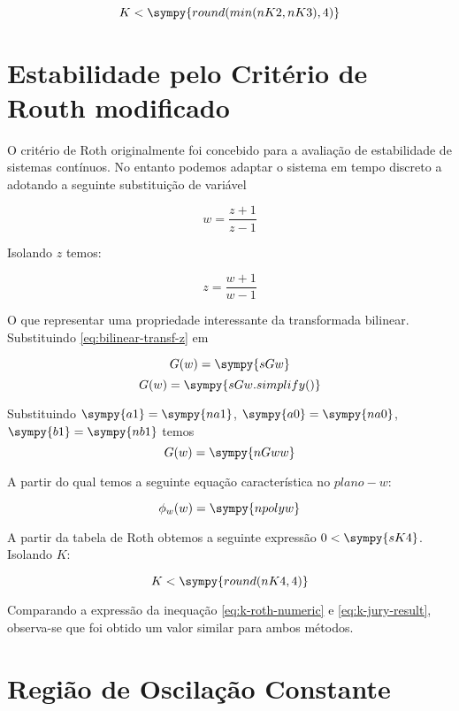 \documentclass[a4paper,11pt]{article}
\newcommand{\npy}[1]{\sympy{round(#1,4)}}
\begin{document}
\begin{equation}\label{eq:k-jury-result}
    K < \sympy{round(min(nK2,nK3),4)}
\end{equation}

\section{Estabilidade pelo Critério de Routh modificado}

O critério de Roth originalmente foi concebido para a avaliação de estabilidade de sistemas contínuos. No entanto podemos adaptar o sistema em tempo discreto a adotando a seguinte substituição de variável

\begin{equation}\label{eq:bilinear-transf-w}
    w = \frac{z+1}{z-1}
\end{equation}

Isolando $z$ temos:

\begin{equation}\label{eq:bilinear-transf-z}
    z = \frac{w+1}{w-1}
\end{equation}

O que representar uma propriedade interessante da transformada bilinear. Substituindo \ref{eq:bilinear-transf-z} em

$$G(w) = \sympy{sGw}$$
$$G(w) = \sympy{sGw.simplify()}$$

Substituindo $\sympy{a1} = \sympy{na1}$, $\sympy{a0} = \sympy{na0}$, $\sympy{b1} = \sympy{nb1}$ temos
$$G(w) = \sympy{nGww}$$

A partir do qual temos a seguinte equação característica no $plano-w$:

\begin{equation}
    \phi_w(w) = \sympy{npolyw}
\end{equation}


A partir da tabela de Roth obtemos a seguinte expressão $0 < \sympy{sK4}$. Isolando $K$:

\begin{equation}\label{eq:k-roth-numeric}
    K < \npy{nK4}
\end{equation}

Comparando a expressão da inequação \ref{eq:k-roth-numeric} e \ref{eq:k-jury-result}, observa-se que foi obtido um valor similar para ambos métodos.

\section{Região de Oscilação Constante}
\end{document}
